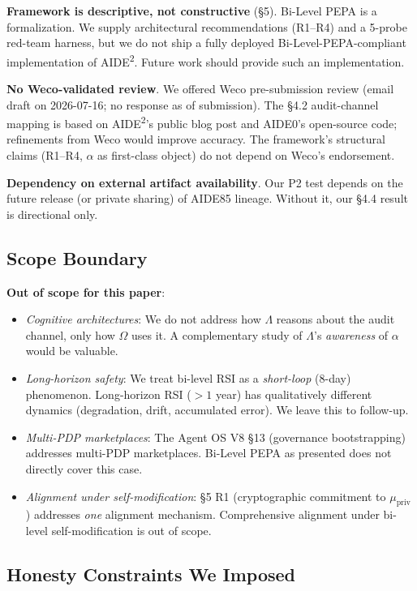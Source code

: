 \documentclass{article}
\theoremstyle{definition}
\begin{document}
\textbf{Framework is descriptive, not constructive} (\S5). Bi-Level PEPA is a formalization. We supply architectural recommendations (R1--R4) and a 5-probe red-team harness, but we do not ship a fully deployed Bi-Level-PEPA-compliant implementation of AIDE\textsuperscript{2}. Future work should provide such an implementation.

\textbf{No Weco-validated review}. We offered Weco pre-submission review (email draft on 2026-07-16; no response as of submission). The \S4.2 audit-channel mapping is based on AIDE\textsuperscript{2}'s public blog post and AIDE0's open-source code; refinements from Weco would improve accuracy. The framework's structural claims (R1--R4, $\alpha$ as first-class object) do not depend on Weco's endorsement.

\textbf{Dependency on external artifact availability}. Our P2 test depends on the future release (or private sharing) of AIDE85 lineage. Without it, our \S4.4 result is directional only.

\subsection{Scope Boundary}

\textbf{Out of scope for this paper}:
\begin{itemize}
    \item \emph{Cognitive architectures}: We do not address how $\Lambda$ reasons about the audit channel, only how $\Omega$ uses it. A complementary study of $\Lambda$'s \emph{awareness} of $\alpha$ would be valuable.
    \item \emph{Long-horizon safety}: We treat bi-level RSI as a \emph{short-loop} (8-day) phenomenon. Long-horizon RSI ($>1$ year) has qualitatively different dynamics (degradation, drift, accumulated error). We leave this to follow-up.
    \item \emph{Multi-PDP marketplaces}: The Agent OS V8 \S13 (governance bootstrapping) addresses multi-PDP marketplaces. Bi-Level PEPA as presented does not directly cover this case.
    \item \emph{Alignment under self-modification}: \S5 R1 (cryptographic commitment to $\mu_{\text{priv}}$) addresses \emph{one} alignment mechanism. Comprehensive alignment under bi-level self-modification is out of scope.
\end{itemize}

\subsection{Honesty Constraints We Imposed}
\end{document}
